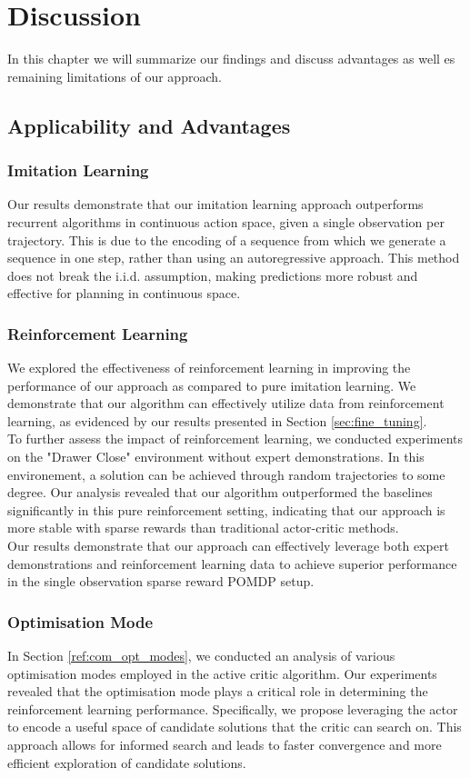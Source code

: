 
\chapter{Discussion}
\label{chapter:Discussion}
In this chapter we will summarize our findings and discuss advantages as well es remaining limitations of our approach.
\section{Applicability and Advantages}
\subsection{Imitation Learning}
Our results demonstrate that our imitation learning approach outperforms recurrent algorithms in continuous action space, 
given a single observation per trajectory. This is due to the encoding of a sequence from which we generate a sequence in one step, 
rather than using an autoregressive approach. This method does not break the i.i.d. assumption, making predictions more robust and effective 
for planning in continuous space. \\
\subsection{Reinforcement Learning}
We explored the effectiveness of reinforcement learning in improving the performance of our approach as compared to pure imitation learning. 
We demonstrate that our algorithm can effectively utilize data from reinforcement learning, as evidenced by our results presented in 
Section \ref{sec:fine_tuning}.\\
To further assess the impact of reinforcement learning, we conducted experiments on the "Drawer Close" environment without expert demonstrations. 
In this environement, a solution can be achieved through random trajectories to some degree. 
Our analysis revealed that our algorithm outperformed the baselines significantly in this pure reinforcement setting, 
indicating that our approach is more stable with sparse rewards than traditional actor-critic methods.\\
Our results demonstrate that our approach can effectively leverage both expert demonstrations and reinforcement learning data to achieve 
superior performance in the single observation sparse reward POMDP setup.

\subsection{Optimisation Mode}
In Section \ref{ref:com_opt_modes}, we conducted an analysis of various optimisation modes employed in the active critic algorithm. 
Our experiments revealed that the optimisation mode plays a critical role in determining the reinforcement learning performance. 
Specifically, we propose leveraging the actor to encode a useful space of candidate solutions that the critic can search on. 
This approach allows for informed search and leads to faster convergence and more efficient exploration of candidate solutions.

